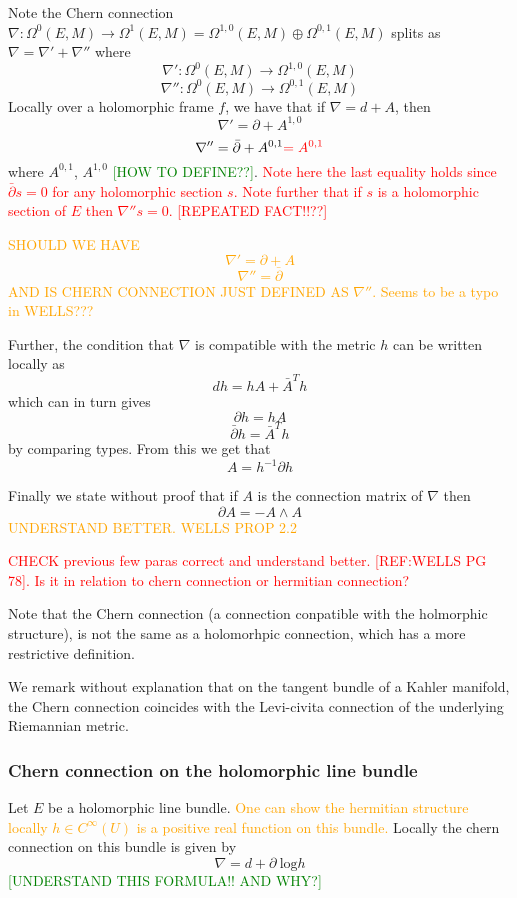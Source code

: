 \documentclass[a4paper]{article}
\theoremstyle{definition} \newtheorem*{definition}{Definition}
\theoremstyle{definition} \newtheorem*{definitions}{Definitions}
\theoremstyle{plain} \newtheorem{theorem}{Theorem}[section]
\theoremstyle{plain} \newtheorem{proposition}[theorem]{Proposition}
\theoremstyle{plain} \newtheorem{corollary}[theorem]{Corollary}
\theoremstyle{plain} \newtheorem{lemma}[theorem]{Lemma}
\theoremstyle{plain} \newtheorem{example}[theorem]{Example}
\newcommand{\checkCorrect}[1]{\textcolor{red}{#1}}
\newcommand{\understandBetter}[1]{\textcolor{orange}{#1}}
\newcommand{\finish}[1]{\textcolor{green}{#1}}
\newcommand{\smooth}{C^\infty}
\begin{document}
Note the Chern connection $\nabla:\Omega^0(E, M)\to \Omega^1(E, M)=\Omega^{1,0}(E, M) \oplus \Omega^{0,1}(E, M)$ splits as
$\nabla = \nabla' + \nabla''$ where
$$\nabla ': \Omega^0(E, M)\to \Omega^{1,0}(E, M)$$
$$\nabla '': \Omega^0(E, M)\to \Omega^{0,1}(E, M)$$
Locally over a holomorphic frame $f$, we have that if $\nabla=d+A$, then 
$$\nabla ' = \partial + A^{1,0}$$
$$\nabla '' = \bar{\partial} + A^{0,1} \checkCorrect{= A^{0,1}}$$
where $A^{0,1}$, $A^{1, 0}$ \finish{[HOW TO DEFINE??]}. \checkCorrect{Note here the last equality holds since  $\bar{\partial}s=0$ for any holomorphic section $s$. Note further that if $s$ is a holomorphic section of $E$ then $\nabla '' s =0$. [REPEATED FACT!!??]}

\understandBetter{SHOULD WE HAVE
$$\nabla ' = \partial + A$$
$$\nabla '' = \bar{\partial}$$
AND IS CHERN CONNECTION JUST DEFINED AS 
$\nabla ''$. Seems to be a typo in WELLS???
}

Further, the condition that $\nabla$ is compatible with the metric $h$ can be written locally as 
$$dh = hA + \bar{A}^Th$$
which can in turn gives 
$$\partial h = h A$$
$$\bar{\partial} h = \bar{A}^T h$$
by comparing types. From this we get that
$$A= h^{-1}\partial h$$

Finally we state without proof that if $A$ is the connection matrix of $\nabla$ then
$$\partial A= -A \wedge A$$
\understandBetter{UNDERSTAND BETTER. WELLS PROP 2.2}

\checkCorrect{CHECK previous few paras correct and understand better. 
[REF:WELLS PG 78]. Is it in relation to chern connection or hermitian connection?} 

Note that the Chern connection (a connection conpatible with the holmorphic structure), is not the same as a holomorhpic connection, which has a more restrictive definition. 

We remark without explanation that on the tangent bundle of a Kahler manifold, the Chern connection coincides with the Levi-civita connection of the underlying Riemannian metric.  

\subsubsection{Chern connection on the holomorphic line bundle}
Let $E$ be a holomorphic line bundle. \understandBetter{One can show the hermitian structure locally $h\in \smooth(U)$ is a positive real function on this bundle.} Locally the chern connection on this bundle is given by 
$$\nabla = d + \partial \ \text{log} h$$
\finish{[UNDERSTAND THIS FORMULA!! AND WHY?]}
\end{document}
